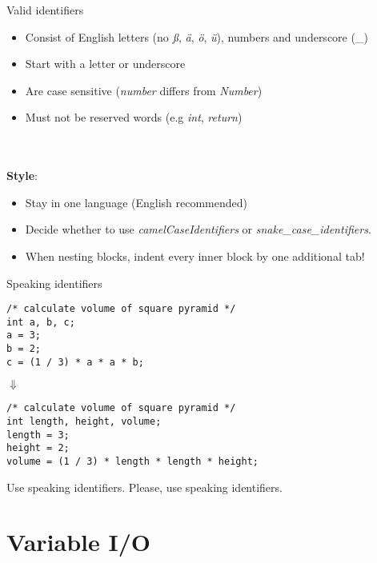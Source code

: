 \begin{frame}{Valid identifiers}
	\begin{itemize}
		\item Consist of English letters (no \textit{ß}, \textit{ä}, \textit{ö}, \textit{ü}), numbers and underscore (\_)
		\item Start with a letter or underscore
		\item Are case sensitive (\textit{number} differs from \textit{Number})
		\item Must not be reserved words (e.g \textit{int}, \textit{return})
	\end{itemize}\ \\\ \\
	\textbf{Style}:\\
	\begin{itemize}
		\item Stay in one language (English recommended)
		\item Decide whether to use \textit{camelCaseIdentifiers} or \textit{snake\_case\_identifiers}.\\
		\item When nesting blocks, indent every inner block by one additional tab!
	\end{itemize}
\end{frame}

\begin{frame}[fragile]{Speaking identifiers}
	\begin{lstlisting}
/* calculate volume of square pyramid */
int a, b, c;
a = 3;
b = 2;
c = (1 / 3) * a * a * b;
\end{lstlisting}
\centering
$\Downarrow$
	\begin{lstlisting}
/* calculate volume of square pyramid */
int length, height, volume;
length = 3;
height = 2;
volume = (1 / 3) * length * length * height;
\end{lstlisting}
\end{frame}

\begin{frame}{Use speaking identifiers.}
	\LARGE
	\centering
	Please, use speaking identifiers.\footnotemark
	
\end{frame}

\section{Variable I/O}
